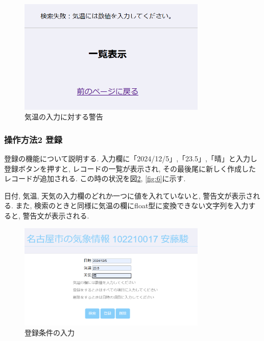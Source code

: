 \documentclass{ltjsarticle} %
\begin{document}
\begin{figure}[H] %
  \centering
  \includegraphics[width=0.8\textwidth]{4.png} %
  \caption{気温の入力に対する警告} %
  \label{fig:4} %
\end{figure}

\subsubsection{操作方法2 登録}
登録の機能について説明する. 入力欄に「2024/12/5」,「23.5」,「晴」と入力し登録ボタンを押すと, レコードの一覧が表示され, 
その最後尾に新しく作成したレコードが追加される. この時の状況を図\ref{fig:5}, \ref{fig:6}に示す. 

日付, 気温, 天気の入力欄のどれか一つに値を入れていないと, 警告文が表示される. 
また, 検索のときと同様に気温の欄にfloat型に変換できない文字列を入力すると, 警告文が表示される. 


\begin{figure}[H] %
  \centering
  \includegraphics[width=0.8\textwidth]{5.png} %
  \caption{登録条件の入力} %
  \label{fig:5} %
\end{figure}
\end{document}
